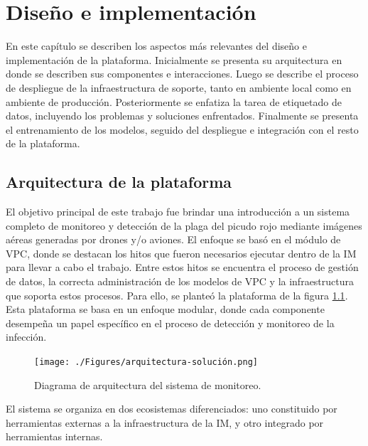 \chapter{Diseño e implementación} %
\label{Chapter3} %

En este capítulo se describen los aspectos más relevantes del diseño e implementación de la plataforma. Inicialmente se presenta su arquitectura en donde se describen sus componentes e interacciones. Luego se describe el proceso de despliegue de la infraestructura de soporte, tanto en ambiente local como en ambiente de producción. Posteriormente se enfatiza la tarea de etiquetado de datos, incluyendo los problemas y soluciones enfrentados. Finalmente se presenta el entrenamiento de los modelos, seguido del despliegue e integración con el resto de la plataforma.

\section{Arquitectura de la plataforma}
\label{sec:arquitectura}

El objetivo principal de este trabajo fue brindar una introducción a un sistema completo de monitoreo y detección de la plaga del picudo rojo mediante imágenes aéreas generadas por drones y/o aviones. El enfoque se basó en el módulo de VPC, donde se destacan los hitos que fueron necesarios ejecutar dentro de la IM para llevar a cabo el trabajo. Entre estos hitos se encuentra el proceso de gestión de datos, la correcta administración de los modelos de VPC y la infraestructura que soporta estos procesos. Para ello, se planteó la plataforma de la figura \ref{fig:plataforma}. Esta plataforma se basa en un enfoque modular, donde cada componente desempeña un papel específico en el proceso de detección y monitoreo de la infección.

\begin{figure}[H]
  \centering
  \texttt{[image: ./Figures/arquitectura-solución.png]}
  \caption{Diagrama de arquitectura del sistema de monitoreo.}
  \label{fig:plataforma}
\end{figure}

El sistema se organiza en dos ecosistemas diferenciados: uno constituido por herramientas externas a la infraestructura de la IM, y otro integrado por herramientas internas.

